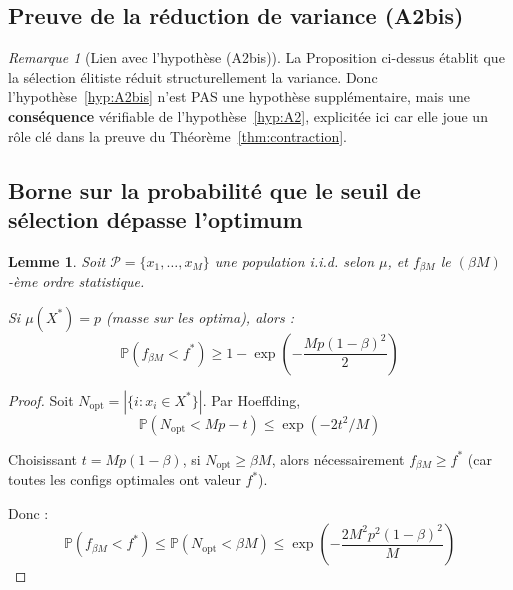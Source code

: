 \documentclass[12pt,a4paper]{article}
\newtheorem{lemma}[theorem]{Lemme}
\theoremstyle{definition}
\theoremstyle{remark}
\newtheorem{remark}[theorem]{Remarque}
\begin{document}

\subsection{Preuve de la réduction de variance (A2bis)}
\label{app:variance-reduction}


\begin{remark}[Lien avec l'hypothèse (A2bis)]
	La Proposition ci-dessus établit que la sélection élitiste réduit 
	structurellement la variance. Donc l'hypothèse~\ref{hyp:A2bis} 
	n'est PAS une hypothèse supplémentaire, mais une \textbf{conséquence} 
	vérifiable de l'hypothèse~\ref{hyp:A2}, explicitée ici car elle 
	joue un rôle clé dans la preuve du Théorème~\ref{thm:contraction}.
\end{remark}


\subsection{Borne sur la probabilité que le seuil de sélection dépasse l'optimum}
\label{app:selection-threshold}

\begin{lemma}
	Soit $\mathcal{P} = \{x_1, \ldots, x_M\}$ une population i.i.d. selon $\mu$, 
	et $f_{\beta M}$ le $(\beta M)$-ème ordre statistique.
	
	Si $\mu(X^*) = p$ (masse sur les optima), alors :
	\begin{equation}
		\mathbb{P}(f_{\beta M} < f^*) \geq 1 - \exp\left(-\frac{Mp(1-\beta)^2}{2}\right)
	\end{equation}
\end{lemma}

\begin{proof}
	Soit $N_{\text{opt}} = |\{i : x_i \in X^*\}|$. Par Hoeffding,
	\begin{equation}
		\mathbb{P}(N_{\text{opt}} < Mp - t) \leq \exp(-2t^2/M)
	\end{equation}
	
	Choisissant $t = Mp(1-\beta)$, si $N_{\text{opt}} \geq \beta M$, 
	alors nécessairement $f_{\beta M} \geq f^*$ (car toutes les configs 
	optimales ont valeur $f^*$).
	
	Donc :
	\begin{equation}
		\mathbb{P}(f_{\beta M} < f^*) \leq \mathbb{P}(N_{\text{opt}} < \beta M)
		\leq \exp\left(-\frac{2M^2p^2(1-\beta)^2}{M}\right)
	\end{equation}
\end{proof}
\end{document}
